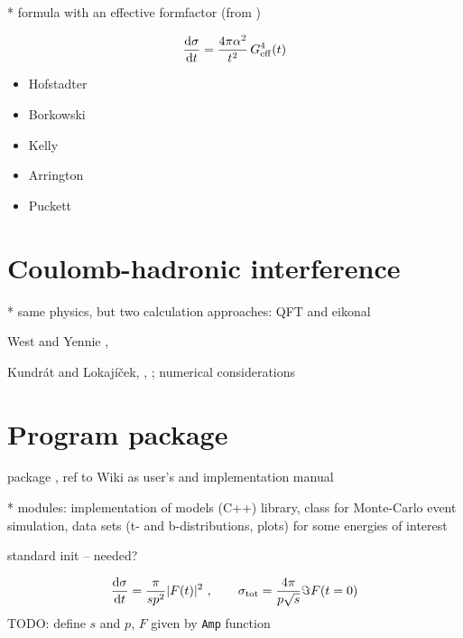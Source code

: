 \documentclass[preprint,12pt]{elsarticle}
\def\d{{\rm d}}
\begin{document}
* formula with an effective formfactor (from \cite[equation (31)]{block06})

\begin{equation}
{\d\sigma\over\d t} = {4\pi \alpha^2\over t^2}\, G_{\rm eff}^4(t)
\end{equation}

\begin{itemize}
\item Hofstadter \cite{hofstadter58}
\item Borkowski \cite{borkowski74,borkowski75}
\item Kelly \cite{kelly04}
\item Arrington \cite{arrington07}
\item Puckett \cite{puckett10}
\end{itemize}




\section{Coulomb-hadronic interference}\label{s:int mod}

* same physics, but two calculation approaches: QFT and eikonal

West and Yennie \cite{wy68}, \cite[section 1.3.4]{jan_thesis}

Kundr\' at and Lokaj\' i\v cek, \cite{kl94}, \cite[section 1.3.5]{jan_thesis};
numerical considerations \cite[section 1.3.6]{jan_thesis}


\section{Program package}\label{s:prog}

package \cite{elegent}, ref to Wiki as user's and implementation manual

* modules: implementation of models (C++) library, class for Monte-Carlo event simulation, data sets (t- and b-distributions, plots) for some energies of interest

standard init -- needed?

\begin{equation}
{\d\sigma\over\d t} = {\pi\over s p^2} |F(t)|^2\ ,\qquad \sigma_{\rm tot} = {4\pi\over p\sqrt s} \Im F(t = 0)
\end{equation}
TODO: define $s$ and $p$, $F$ given by {\tt Amp} function
\end{document}
